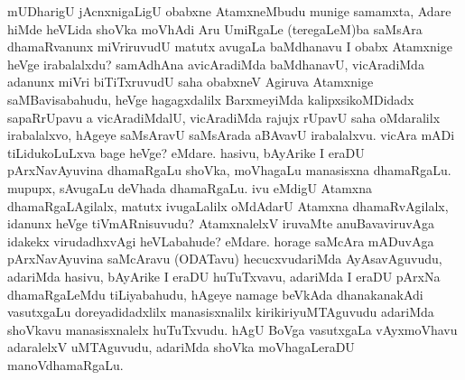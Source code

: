 
\begin{artha}
mUDharigU jAcnxnigaLigU obabxne AtamxneMbudu munige samamxta, Adare hiMde heVLida shoVka moVhAdi Aru UmiRgaLe (teregaLeM)ba saMsAra dhamaRvanunx miVriruvudU matutx avugaLa baMdhanavu I obabx Atamxnige heVge irabalalxdu? samAdhAna avicAradiMda baMdhanavU, vicAradiMda adanunx miVri biTiTxruvudU saha obabxneV Agiruva Atamxnige saMBavisabahudu, heVge hagagxdalilx BarxmeyiMda kalipxsikoMDidadx sapaRrUpavu a vicAradiMdalU, vicAradiMda rajujx rUpavU saha oMdaralilx irabalalxvo, hAgeye saMsAravU saMsArada aBAvavU irabalalxvu. vicAra mADi tiLidukoLuLxva bage heVge? eMdare. hasivu, bAyArike I eraDU pArxNavAyuvina dhamaRgaLu shoVka, moVhagaLu manasisxna dhamaRgaLu. mupupx, sAvugaLu deVhada dhamaRgaLu. ivu eMdigU Atamxna dhamaRgaLAgilalx, matutx ivugaLalilx oMdAdarU Atamxna dhamaRvAgilalx, idanunx heVge tiVmARnisuvudu? AtamxnalelxV iruvaMte anuBavaviruvAga idakekx virudadhxvAgi heVLabahude? eMdare. horage saMcAra mADuvAga pArxNavAyuvina saMcAravu (ODATavu) hecucxvudariMda AyAsavAguvudu, adariMda hasivu, bAyArike I eraDU huTuTxvavu, adariMda I eraDU pArxNa dhamaRgaLeMdu tiLiyabahudu, hAgeye namage beVkAda dhanakanakAdi vasutxgaLu doreyadidadxlilx manasisxnalilx kirikiriyuMTAguvudu adariMda shoVkavu manasisxnalelx huTuTxvudu. hAgU BoVga vasutxgaLa vAyxmoVhavu adaralelxV uMTAguvudu, adariMda shoVka moVhagaLeraDU manoVdhamaRgaLu.
\end{artha}

